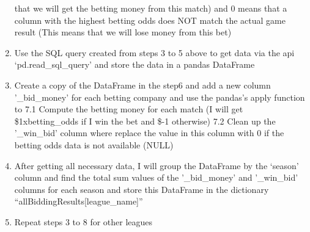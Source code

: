 \documentclass[11pt]{article}
\begin{document}
\begin{enumerate}
  that we will get the betting money from this match) and 0 means that a
  column with the highest betting odds does NOT match the actual game
  result (This means that we will lose money from this bet)
\item
  Use the SQL query created from steps 3 to 5 above to get data via the
  api `pd.read\_sql\_query' and store the data in a pandas DataFrame
\item
  Create a copy of the DataFrame in the step6 and add a new column
  '\_bid\_money' for each betting company and use the pandas's apply
  function to 7.1 Compute the betting money for each match (I will get
  \$1xbetting\_odds if I win the bet and \$-1 otherwise) 7.2 Clean up
  the '\_win\_bid' column where replace the value in this column with 0
  if the betting odds data is not available (NULL)
\item
  After getting all necessary data, I will group the DataFrame by the
  `season' column and find the total sum values of the '\_bid\_money'
  and '\_win\_bid' columns for each season and store this DataFrame in
  the dictionary ``allBiddingResults{[}league\_name{]}''
\item
  Repeat steps 3 to 8 for other leagues
\end{enumerate}
\end{document}
